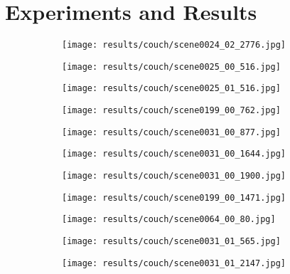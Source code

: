 \chapter{Experiments and Results}
\begin{figure}[h!]
  \centering
  \begin{subfigure}[b]{0.32\linewidth}
    \texttt{[image: results/couch/scene0024\_02\_2776.jpg]}
  \end{subfigure}
  \begin{subfigure}[b]{0.32\linewidth}
    \texttt{[image: results/couch/scene0025\_00\_516.jpg]}
  \end{subfigure}
  \begin{subfigure}[b]{0.32\linewidth}
    \texttt{[image: results/couch/scene0025\_01\_516.jpg]}
  \end{subfigure}
  \begin{subfigure}[b]{0.32\linewidth}
    \texttt{[image: results/couch/scene0199\_00\_762.jpg]}
  \end{subfigure}
  \begin{subfigure}[b]{0.32\linewidth}
    \texttt{[image: results/couch/scene0031\_00\_877.jpg]}
  \end{subfigure}
  \begin{subfigure}[b]{0.32\linewidth}
    \texttt{[image: results/couch/scene0031\_00\_1644.jpg]}
  \end{subfigure}
  \begin{subfigure}[b]{0.32\linewidth}
    \texttt{[image: results/couch/scene0031\_00\_1900.jpg]}
  \end{subfigure}
  \begin{subfigure}[b]{0.32\linewidth}
    \texttt{[image: results/couch/scene0199\_00\_1471.jpg]}
  \end{subfigure}
  \begin{subfigure}[b]{0.32\linewidth}
    \texttt{[image: results/couch/scene0064\_00\_80.jpg]}
  \end{subfigure}
  \begin{subfigure}[b]{0.32\linewidth}
    \texttt{[image: results/couch/scene0031\_01\_565.jpg]}
  \end{subfigure}
  \begin{subfigure}[b]{0.32\linewidth}
    \texttt{[image: results/couch/scene0031\_01\_2147.jpg]}
  \end{subfigure}

\end{figure}
